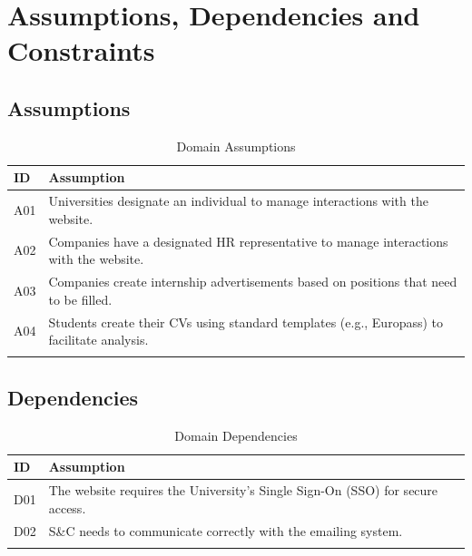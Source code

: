 \section{Assumptions, Dependencies and Constraints}
\label{sec:assumptions_dependencies_and_constraints}%

\subsection{Assumptions}
\label{sub:assumptions}%

\begin{longtable}{|l|p{}|}
      \hline
      \textbf{ID} & \textbf{Assumption}                                                                         \\
      \hline
      A01         & Universities designate an individual to manage interactions with the website.               \\
      \hline
      A02         & Companies have a designated HR representative to manage interactions with the website.      \\
      \hline
      A03         & Companies create internship advertisements based on positions that need to be filled.       \\
      \hline
      A04         & Students create their CVs using standard templates (e.g., Europass) to facilitate analysis. \\
      \hline

      \caption{Domain Assumptions}
      \label{tab:domain_assumptions}
\end{longtable}

\subsection{Dependencies}
\label{sub:dependencies}%

\begin{longtable}{|l|p{}|}
      \hline
      \textbf{ID} & \textbf{Assumption}                                                           \\
      \hline
      D01         & The website requires the University's Single Sign-On (SSO) for secure access. \\
      \hline
      D02         & S\&C needs to communicate correctly with the emailing system.                 \\
      \hline

      \caption{Domain Dependencies}
      \label{tab:domain_dependencies}
\end{longtable}

